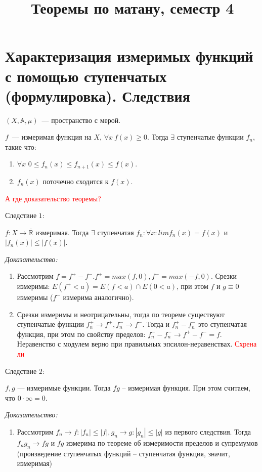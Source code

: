 \documentclass[paper=a4, fontsize=17pt]{article}
\title{Теоремы по матану, семестр 4}
\begin{document}
\maketitle
\tableofcontents
\newpage

\section{Характеризация измеримых функций с помощью ступенчатых (формулировка). Следствия}
$(X,\mathds{A},\mu)$~--- пространство с мерой.

$f$~--- измеримая функция на $X$, $\forall x\ f(x) \geq 0$. Тогда $\exists$ ступенчатые функции $f_n$, такие что:
\begin{enumerate}
    \item $\forall x$ $0 \leq f_n(x) \leq f_{n+1}(x) \leq f(x)$.
    \item $f_n(x)$ поточечно сходится к $f(x)$.
\end{enumerate}

\textcolor{red}{А где доказательство теоремы?}

Следствие $1$:

$f: X \rightarrow \overline {\mathds{R}}$ измеримая. Тогда $\exists$ ступенчатая $f_n: \forall x:  lim f_n(x) = f(x)$ и $|f_n(x)| \leq |f(x)|$.

\emph{Доказательство:}

\begin{enumerate}
	\item Рассмотрим $f = f^+ - f^-. f^+ = max(f, 0), f^- = max(-f, 0)$. Срезки измеримы: $E(f^+  < a) = E(f < a) \cap E(0 < a)$, при этом $f$  и $g \equiv 0$ измеримы ($f^-$ измерима аналогично).
	\item Срезки измеримы и неотрицательны, тогда по теореме существуют ступенчатые функции $f^+_n \rightarrow f^+, f^-_n \rightarrow f^-$. Тогда и $f^+_n - f^-_n$ это ступенчатая функция, при этом по свойству пределов: $f^+_n - f^-_n \rightarrow f^+ - f^- = f$. Неравенство с модулем верно при правильных эпсилон-неравенствах.
	\textcolor{red}{Схрена ли}
\end{enumerate}

Следствие $2$:

$f, g$ --- измеримые функции. Тогда $fg$ -- измеримая функция. При этом считаем, что $0 \cdot \infty = 0$.

\emph{Доказательство:}
\begin{enumerate}
	\item Рассмотрим $f_n \rightarrow f: |f_n| \leq |f|, g_n \rightarrow g: |g_n| \leq |g|$ из первого следствия. Тогда $f_ng_n \rightarrow fg$ и $fg$ измерима по теореме об измеримости пределов и супремумов (произведение ступенчатых функций -- ступенчатая функция, значит, измеримая)
\end{enumerate}
\end{document}
